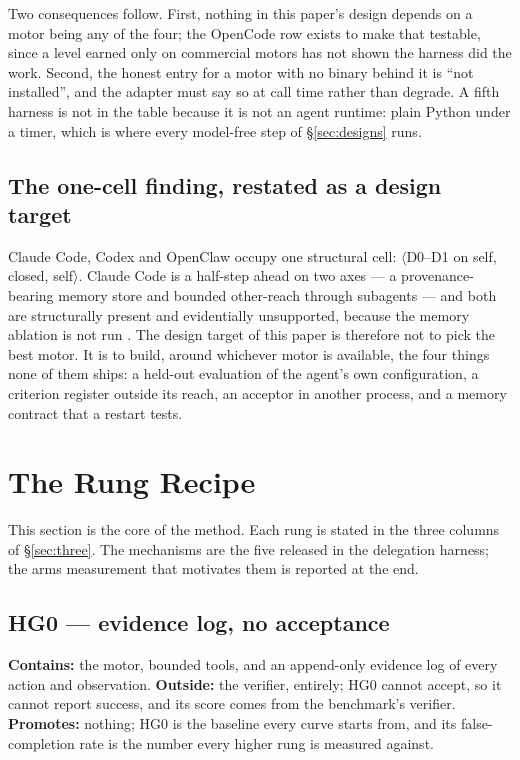 \documentclass[11pt]{article}
\theoremstyle{definition}
\begin{document}
Two consequences follow. First, nothing in this paper's design depends on a motor being any of the four; the OpenCode row exists to make that testable, since a level earned only on commercial motors has not shown the harness did the work. Second, the honest entry for a motor with no binary behind it is ``not installed'', and the adapter must say so at call time rather than degrade. A fifth harness is not in the table because it is not an agent runtime: plain Python under a timer, which is where every model-free step of \S\ref{sec:designs} runs.

\subsection{The one-cell finding, restated as a design target}

Claude Code, Codex and OpenClaw occupy one structural cell: $\langle$D0--D1 on self, closed, self$\rangle$. Claude Code is a half-step ahead on two axes --- a provenance-bearing memory store and bounded other-reach through subagents --- and both are structurally present and evidentially unsupported, because the memory ablation is not run \citep{yang2026capability}. The design target of this paper is therefore not to pick the best motor. It is to build, around whichever motor is available, the four things none of them ships: a held-out evaluation of the agent's own configuration, a criterion register outside its reach, an acceptor in another process, and a memory contract that a restart tests.

\section{The Rung Recipe}\label{sec:recipe}

This section is the core of the method. Each rung is stated in the three columns of \S\ref{sec:three}. The mechanisms are the five released in the delegation harness; the arms measurement that motivates them is reported at the end.

\subsection{HG0 --- evidence log, no acceptance}

\textbf{Contains:} the motor, bounded tools, and an append-only evidence log of every action and observation. \textbf{Outside:} the verifier, entirely; HG0 cannot accept, so it cannot report success, and its score comes from the benchmark's verifier. \textbf{Promotes:} nothing; HG0 is the baseline every curve starts from, and its false-completion rate is the number every higher rung is measured against.
\end{document}
